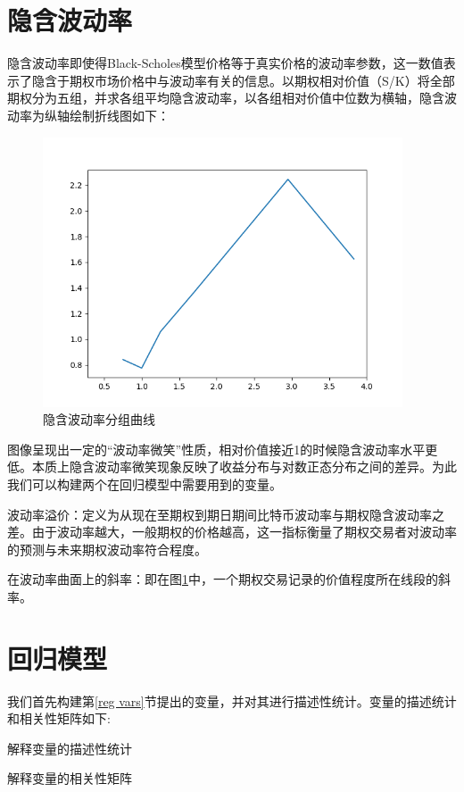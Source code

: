 \section{隐含波动率}
隐含波动率即使得Black-Scholes模型价格等于真实价格的波动率参数，这一数值表示了隐含于期权市场价格中与波动率有关的信息。以期权相对价值（S/K）将全部期权分为五组，并求各组平均隐含波动率，以各组相对价值中位数为横轴，隐含波动率为纵轴绘制折线图如下：
\begin{figure}[H]
    \begin{small}
        \begin{center}
            \includegraphics[width=0.95\textwidth]{figures/mean_isd.png}
        \end{center}
        \caption{隐含波动率分组曲线}
        \label{fig:mean_isd}
    \end{small}
\end{figure}
图像呈现出一定的“波动率微笑”性质，相对价值接近1的时候隐含波动率水平更低。本质上隐含波动率微笑现象反映了收益分布与对数正态分布之间的差异。为此我们可以构建两个在回归模型中需要用到的变量。
\par{
    波动率溢价：定义为从现在至期权到期日期间比特币波动率与期权隐含波动率之差。由于波动率越大，一般期权的价格越高，这一指标衡量了期权交易者对波动率的预测与未来期权波动率符合程度。
}
\par{
    在波动率曲面上的斜率：即在图\ref{fig:mean_isd}中，一个期权交易记录的价值程度所在线段的斜率。
}
\section{回归模型}
我们首先构建第\ref{reg vars}节提出的变量，并对其进行描述性统计。变量的描述统计和相关性矩阵如下:
\newpage
{}
\begin{landscape} 
    \begin{table}[H]
        \caption{解释变量的描述性统计}
        \resizebox{\linewidth}{!}{
        
        }
    \end{table}
    \begin{table}[H]
        \caption{解释变量的相关性矩阵}
        \resizebox{\linewidth}{!}{    }
    \end{table}    
\end{landscape}

